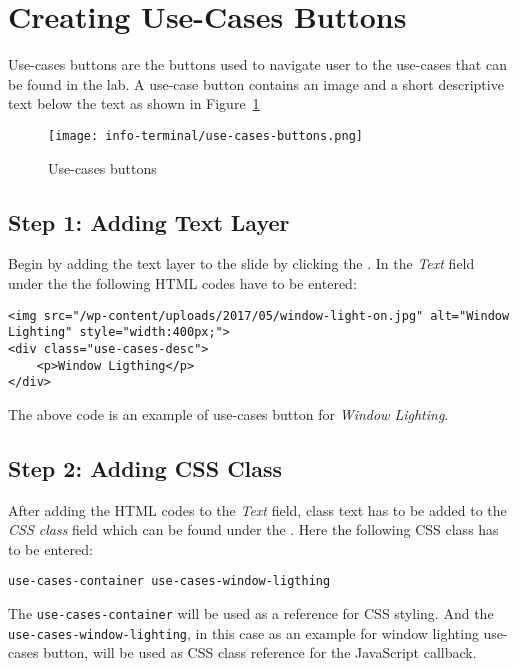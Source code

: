 \section{Creating Use-Cases Buttons}
Use-cases buttons are the buttons used to navigate user to the use-cases that can be found in the lab. A use-case button contains an image and a short descriptive text below the text as shown in Figure~\ref{fig:use-cases-buttons}

\begin{figure}[ht]
\caption{Use-cases buttons}
\label{fig:use-cases-buttons}
\centering
\texttt{[image: info-terminal/use-cases-buttons.png]}
\end{figure}

\subsection*{Step 1: Adding Text Layer}
Begin by adding the text layer to the slide by clicking the . In the \emph{Text} field under the  the following HTML codes have to be entered:

\begin{lstlisting}
<img src="/wp-content/uploads/2017/05/window-light-on.jpg" alt="Window Lighting" style="width:400px;">
<div class="use-cases-desc">
	<p>Window Ligthing</p>
</div>
\end{lstlisting}

The above code is an example of use-cases button for \emph{Window Lighting}.

\subsection*{Step 2: Adding CSS Class}
After adding the HTML codes to the \emph{Text} field, class text has to be added to the \emph{CSS class} field which can be found under the  . Here the following CSS class has to be entered:
\begin{lstlisting}
use-cases-container use-cases-window-ligthing
\end{lstlisting}

The \texttt{use-cases-container} will be used as a reference for CSS styling. And the \texttt{use-cases-window-lighting}, in this case as an example for window lighting use-cases button, will be used as CSS class reference for the JavaScript callback.

